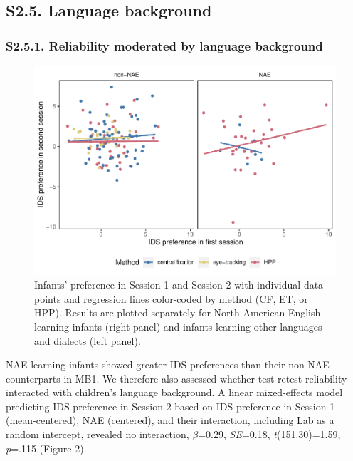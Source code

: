 \documentclass[
  english,
  man, donotrepeattitle,floatsintext]{apa6}
\begin{document}
\hypertarget{s2.5.-language-background}{%
\subsection{S2.5. Language background}\label{s2.5.-language-background}}

\hypertarget{s2.5.1.-reliability-moderated-by-language-background}{%
\subsubsection{S2.5.1. Reliability moderated by language background}\label{s2.5.1.-reliability-moderated-by-language-background}}

\begin{figure}
\centering
\includegraphics{MB1T_supplement_files/figure-latex/unnamed-chunk-15-1.pdf}
\caption{\label{fig:unnamed-chunk-15}Infants' preference in Session 1 and Session 2 with individual data points and regression lines color-coded by method (CF, ET, or HPP). Results are plotted separately for North American English-learning infants (right panel) and infants learning other languages and dialects (left panel).}
\end{figure}

NAE-learning infants showed greater IDS preferences than their non-NAE counterparts in MB1.
We therefore also assessed whether test-retest reliability interacted with children's language background.
A linear mixed-effects model predicting IDS preference in Session 2 based on IDS preference in Session 1 (mean-centered), NAE (centered), and their interaction, including Lab as a random intercept, revealed no interaction, \(\beta\)=0.29, \emph{SE}=0.18, \emph{t}(151.30)=1.59, \emph{p}=.115 (Figure 2).
\end{document}
